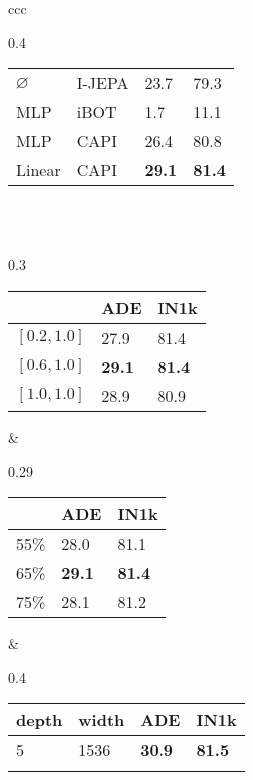 \begin{table*}[t]
{\begin{tabular}[b]{ccc}
\begin{subtable}[t]{0.4\textwidth}
\begin{tabular}{llll}
          \midrule
          $\varnothing$ & I-JEPA & 23.7 & 79.3 \\
          MLP & iBOT & \phantom{0}1.7 & 11.1 \\
          MLP & CAPI & 26.4 & 80.8 \\
          \rowcolor{lightgray}
          Linear & CAPI & \bfseries 29.1 & \bfseries 81.4 \\
        \end{tabular}
        \caption{Loss formulation}
        \label{tab:ablations:proj_head}
      \end{subtable}
      \\
      \\
      \begin{subtable}[t]{0.3\textwidth}
        \centering
        \begin{tabular}{lll}
          & ADE & IN1k \\
          \midrule
          $[0.2, 1.0]$ & 27.9 & 81.4 \\
          \rowcolor{lightgray}
          $[0.6, 1.0]$ & \bfseries 29.1 & \bfseries 81.4 \\
          \rowcolor{white}
          $[1.0, 1.0]$ & 28.9 & 80.9 \\
        \end{tabular}
        \caption{Crop range}
        \label{tab:ablations:crop_range}
      \end{subtable}
      &
      \begin{subtable}[t]{0.29\textwidth}
        \centering
        \begin{tabular}{lll}
          & ADE & IN1k \\
          \midrule
          55\% & 28.0 & 81.1 \\
          \rowcolor{lightgray}
          65\% & \bfseries 29.1 & \bfseries 81.4 \\
          \rowcolor{white}
          75\% & 28.1 & 81.2 \\
        \end{tabular}
        \caption{Masking ratio}
        \label{tab:ablations:mask_ratio}
      \end{subtable}
      &
      \begin{subtable}[t]{0.4\textwidth}
        \centering
        \begin{tabular}{llll}
          depth & width & ADE & IN1k \\
          \midrule
          5 & 1536 & \bfseries 30.9 & \bfseries 81.5 \\
          \rowcolor{lightgray}

\end{tabular}
\end{subtable}
\end{tabular}}
\end{table*}
